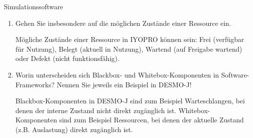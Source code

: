 \documentclass{article}
\begin{document}
\begin{exercise}{Simulationssoftware}
\begin{enumerate}
    \item Gehen Sie insbesondere auf die möglichen Zustände einer Ressource ein.
          \begin{solution}
            Mögliche Zustände einer Ressource in IYOPRO können sein: Frei (verfügbar für Nutzung), Belegt (aktuell in Nutzung), Wartend (auf Freigabe wartend) oder Defekt (nicht funktionsfähig).
          \end{solution}

    \item Worin unterscheiden sich Blackbox- und Whitebox-Komponenten in Software-Frameworks? Nennen Sie jeweils ein Beispiel in DESMO-J!
          \begin{solution}
            Blackbox-Komponenten in DESMO-J sind zum Beispiel Warteschlangen, bei denen der interne Zustand nicht direkt zugänglich ist. Whitebox-Komponenten sind zum Beispiel Ressourcen, bei denen der aktuelle Zustand (z.B. Auslastung) direkt zugänglich ist.
          \end{solution}
  \end{enumerate}
\end{exercise}
\end{document}
